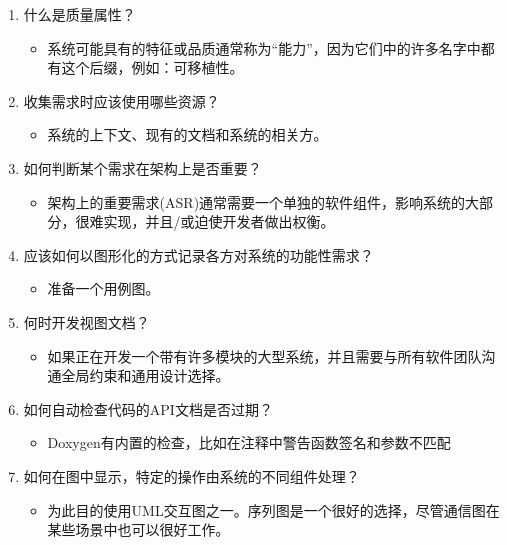 \begin{enumerate}
\item
什么是质量属性？

\begin{itemize}
\item 
系统可能具有的特征或品质通常称为“能力”，因为它们中的许多名字中都有这个后缀，例如：可移植性。
\end{itemize}

\item
收集需求时应该使用哪些资源？

\begin{itemize}
\item 
系统的上下文、现有的文档和系统的相关方。
\end{itemize}

\item
如何判断某个需求在架构上是否重要？

\begin{itemize}
\item 
架构上的重要需求(ASR)通常需要一个单独的软件组件，影响系统的大部分，很难实现，并且/或迫使开发者做出权衡。
\end{itemize}

\item
应该如何以图形化的方式记录各方对系统的功能性需求？

\begin{itemize}
\item 
准备一个用例图。
\end{itemize}

\item
何时开发视图文档？

\begin{itemize}
\item 
如果正在开发一个带有许多模块的大型系统，并且需要与所有软件团队沟通全局约束和通用设计选择。
\end{itemize}

\item
如何自动检查代码的API文档是否过期？

\begin{itemize}
\item 
Doxygen有内置的检查，比如在注释中警告函数签名和参数不匹配
\end{itemize}

\item
如何在图中显示，特定的操作由系统的不同组件处理？

\begin{itemize}
\item 
为此目的使用UML交互图之一。序列图是一个很好的选择，尽管通信图在某些场景中也可以很好工作。
\end{itemize}

\end{enumerate}